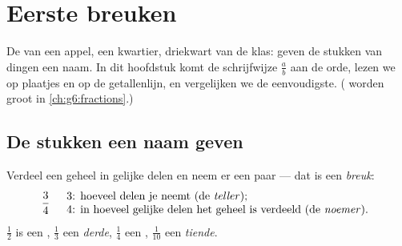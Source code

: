 \chapter{Eerste breuken}\label{ch:g4:fractions}

De  van een appel, een kwartier, driekwart van de klas:  geven
de stukken van dingen een naam. In dit hoofdstuk komt de schrijfwijze
$\frac{a}{b}$ aan de orde, lezen we  op plaatjes en op de
getallenlijn, en vergelijken we de eenvoudigste. ( worden groot in
\cref{ch:g6:fractions}.)

\section{De stukken een naam geven}

\begin{definition}[Breuk]\label{def:g4:fractions:def}
Verdeel een geheel in gelijke delen en neem er een paar --- dat is een
\emph{breuk}:
\[
\frac{3}{4}
\quad
\begin{array}{l}
3 \text{: hoeveel delen je neemt (de \emph{teller}\index{teller});}\\
4 \text{: in hoeveel gelijke delen het geheel is verdeeld (de
\emph{noemer}\index{noemer}).}
\end{array}
\]
$\frac12$ is een \emph{}, $\frac13$ een \emph{derde}, $\frac14$ een
\emph{}, $\frac{1}{10}$ een \emph{tiende}.
\end{definition}


